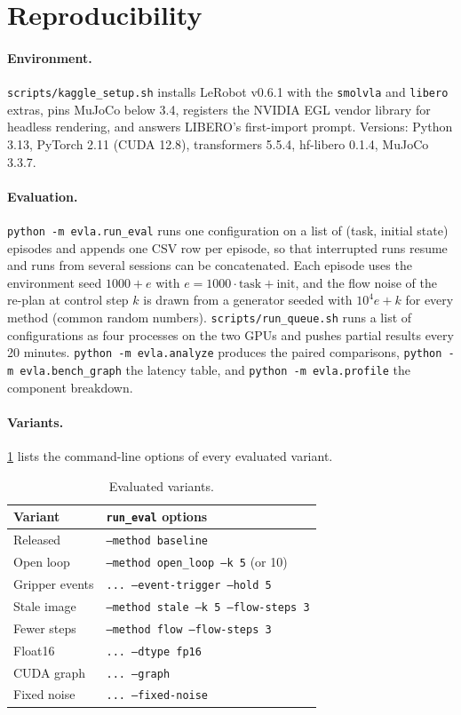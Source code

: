 \section{Reproducibility}
\label{app:repro}

\paragraph{Environment.}
\texttt{scripts/kaggle\_setup.sh} installs LeRobot v0.6.1 with the \texttt{smolvla} and \texttt{libero} extras, pins MuJoCo below 3.4, registers the NVIDIA EGL vendor library for headless rendering, and answers LIBERO's first-import prompt.
Versions: Python 3.13, PyTorch 2.11 (CUDA 12.8), transformers 5.5.4, hf-libero 0.1.4, MuJoCo 3.3.7.

\paragraph{Evaluation.}
\texttt{python -m evla.run\_eval} runs one configuration on a list of (task, initial state) episodes and appends one CSV row per episode, so that interrupted runs resume and runs from several sessions can be concatenated.
Each episode uses the environment seed $1000+e$ with $e=1000\cdot\text{task}+\text{init}$, and the flow noise of the re-plan at control step $k$ is drawn from a generator seeded with $10^4 e+k$ for every method (common random numbers).
\texttt{scripts/run\_queue.sh} runs a list of configurations as four processes on the two GPUs and pushes partial results every 20 minutes.
\texttt{python -m evla.analyze} produces the paired comparisons, \texttt{python -m evla.bench\_graph} the latency table, and \texttt{python -m evla.profile} the component breakdown.

\paragraph{Variants.}
\cref{tab:variants} lists the command-line options of every evaluated variant.

\begin{table}[ht]
\centering\footnotesize
\setlength{\tabcolsep}{3pt}
\begin{tabular}{@{}ll@{}}
\toprule
Variant & \texttt{run\_eval} options \\
\midrule
Released & \texttt{--method baseline} \\
Open loop & \texttt{--method open\_loop --k 5} (or 10) \\
Gripper events & \texttt{... --event-trigger --hold 5} \\
Stale image & \texttt{--method stale --k 5 --flow-steps 3} \\
Fewer steps & \texttt{--method flow --flow-steps 3} \\
Float16 & \texttt{... --dtype fp16} \\
CUDA graph & \texttt{... --graph} \\
Fixed noise & \texttt{... --fixed-noise} \\
\bottomrule
\end{tabular}
\caption{Evaluated variants.}
\label{tab:variants}
\end{table}

